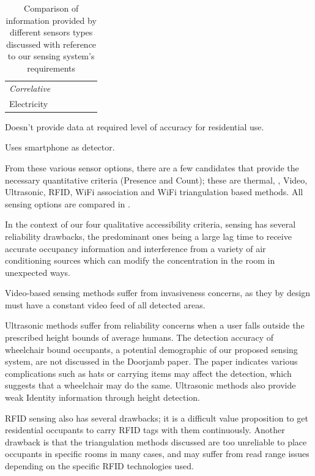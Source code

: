 \documentclass[../thesis/thesis.tex]{subfiles}
\begin{document}
\begin{table}[h]
\begin{threeparttable}
\begin{tabularx}{\textwidth}{|l|l|l||l||l|l|}
\hspace{3mm}\textit{Correlative} 	& & & & & \\
\hspace{8mm}Electricity 		& \cmark\ssup & \xmark & \cmark & & \\

\cline{1-6}
\end{tabularx}
\begin{tablenotes}
\item \ssup  Doesn't provide data at required level of accuracy for residential use.
\item \tsup  Uses smartphone as detector.
\end{tablenotes}
\end{threeparttable}
\caption{Comparison of information provided by different sensors types discussed with reference to our sensing system's requirements}
\label{tab:litreview:taxonomycomp}
\end{table}

From these various sensor options, there are a few candidates that provide the necessary quantitative criteria (Presence and Count); these are thermal, \cdi, Video, Ultrasonic, RFID, WiFi association and WiFi triangulation based methods. All sensing options are compared in .

In the context of our four qualitative accessibility criteria, \cdi sensing has several reliability drawbacks, the predominant ones being a large lag time to receive accurate occupancy information and interference from a variety of air conditioning sources which can modify the \cdi concentration in the room in unexpected ways.

Video-based sensing methods suffer from invasiveness concerns, as they by design must have a constant video feed of all detected areas.

Ultrasonic methods suffer from reliability concerns when a user falls outside the prescribed height bounds of average humans. The detection accuracy of wheelchair bound occupants, a potential demographic of our proposed sensing system, are not discussed in the Doorjamb paper. The paper indicates various complications such as hats or carrying items may affect the detection, which suggests that a wheelchair may do the same. Ultrasonic methods also provide weak Identity information through height detection.

RFID sensing also has several drawbacks; it is a difficult value proposition to get residential occupants to carry RFID tags with them continuously. Another drawback is that the triangulation methods discussed are too unreliable to place occupants in specific rooms in many cases, and may suffer from read range issues depending on the specific RFID technologies used.
\end{document}
